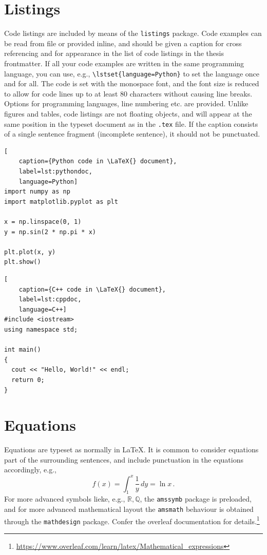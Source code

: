 \section{Listings}

Code listings are included by means of the \texttt{listings} package. Code examples can be read from file or provided inline, and should be given a caption for cross referencing and for appearance in the list of code listings in the thesis frontmatter. If all your code examples are written in the same programming language, you can use, e.g., \texttt{\textbackslash lstset\{language=Python\}} to set the language once and for all. The code is set with the monospace font, and the font size is reduced to allow for code lines up to at least 80 characters without causing line breaks. Options for programming languages, line numbering etc. are provided. Unlike figures and tables, code listings are not floating objects, and will appear at the same position in the typeset document as in the \texttt{.tex} file. If the caption consists of a single sentence fragment (incomplete sentence), it should not be punctuated.





\begin{lstlisting}[
    caption={Python code in \LaTeX{} document},
    label=lst:pythondoc,
    language=Python]
import numpy as np
import matplotlib.pyplot as plt

x = np.linspace(0, 1)
y = np.sin(2 * np.pi * x)

plt.plot(x, y)
plt.show()
\end{lstlisting}

\begin{lstlisting}[
    caption={C++ code in \LaTeX{} document},
    label=lst:cppdoc,
    language=C++]
#include <iostream>
using namespace std;

int main()
{
  cout << "Hello, World!" << endl;
  return 0;
}
\end{lstlisting}

\section{Equations}

Equations are typeset as normally in \LaTeX{}. It is common to consider equations part of the surrounding sentences, and include punctuation in the equations accordingly, e.g.,
\begin{equation}
    f(x) = \int_1^x \frac{1}{y}\,dy = \ln x\,.
    \label{eq:logarithm}
\end{equation}
For more advanced symbols lieke, e.g., $\mathbb{R}, \mathbb{Q}$, the \texttt{amssymb} package is preloaded, and for more advanced mathematical layout the \texttt{amsmath} behaviour is obtained through the \texttt{mathdesign} package. Confer the overleaf documentation for details.\footnote{\url{https://www.overleaf.com/learn/latex/Mathematical_expressions}}

